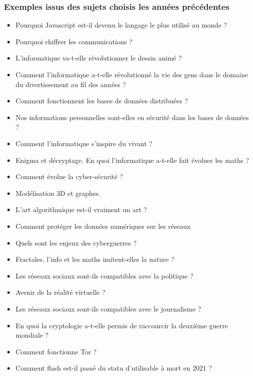 \documentclass[
  a4paper,
  DIV=11,
  numbers=noendperiod]{scrartcl}
\providecommand{\tightlist}{%
  \setlength{\itemsep}{0pt}\setlength{\parskip}{0pt}}\usepackage{longtable,booktabs,array}
\begin{document}
\hypertarget{exemples-issus-des-sujets-choisis-les-annuxe9es-pruxe9cuxe9dentes}{%
\subsubsection{Exemples issus des sujets choisis les années
précédentes}\label{exemples-issus-des-sujets-choisis-les-annuxe9es-pruxe9cuxe9dentes}}

\begin{itemize}
\tightlist
\item
  Pourquoi Javascript est-il devenu le langage le plus utilisé au monde
  ?
\item
  Pourquoi chiffrer les communications ?
\item
  L'informatique va-t-elle révolutionner le dessin animé ?
\item
  Comment l'informatique a-t-elle révolutionné la vie des gens dans le
  domaine du divertissement au fil des années ?
\item
  Comment fonctionnent les bases de données distribuées ?
\item
  Nos informations personnelles sont-elles en sécurité dans les bases de
  données ?
\item
  Comment l'informatique s'inspire du vivant ?
\item
  Enigma et décryptage. En quoi l'informatique a-t-elle fait évoluer les
  maths ?
\item
  Comment évolue la cyber-sécurité ?
\item
  Modélisation 3D et graphes.
\item
  L'art algorithmique est-il vraiment un art ?
\item
  Comment protéger les données numériques sur les réseaux
\item
  Quels sont les enjeux des cyberguerres ?
\item
  Fractales, l'info et les maths imitent-elles la nature ?
\item
  Les réseaux sociaux sont-ils compatibles avec la politique ?
\item
  Avenir de la réalité virtuelle ?
\item
  Les réseaux sociaux sont-ils compatibles avec le journalisme ?
\item
  En quoi la cryptologie a-t-elle permis de raccourcir la deuxième
  guerre mondiale ?
\item
  Comment fonctionne Tor ?
\item
  Comment flash est-il passé du statu d'utilisable à mort en 2021 ?

\end{itemize}
\end{document}

